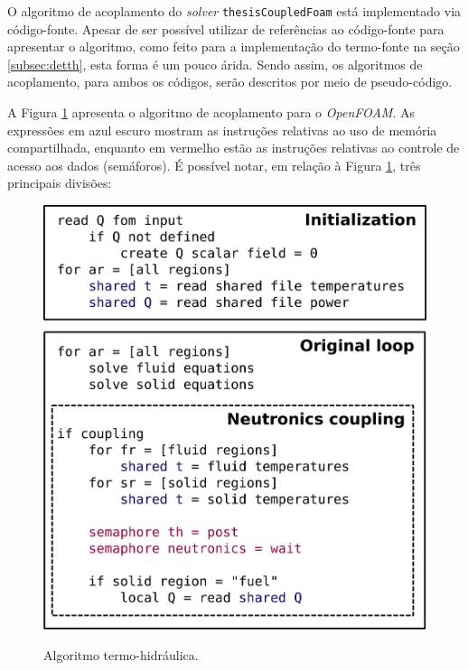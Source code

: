 O algoritmo de acoplamento do \textit{solver} \texttt{thesisCoupledFoam} está implementado
via código-fonte. Apesar de ser possível utilizar de referências ao código-fonte para
apresentar o algoritmo, como feito para a implementação do termo-fonte na seção \ref{subsec:detth},
esta forma é um pouco árida. Sendo assim, os algoritmos de acoplamento, para ambos os códigos,
serão descritos por meio de pseudo-código.

A Figura \ref{fig:algo_th} apresenta o algoritmo de acoplamento para o \textit{OpenFOAM}.
As expressões em azul escuro mostram as instruções relativas ao uso de memória compartilhada,
enquanto em vermelho estão as instruções relativas ao controle de acesso aos dados (semáforos).
É possível notar, em relação à Figura \ref{fig:algo_th}, três principais divisões:

\begin{figure}[htb]
  \caption{Algoritmo termo-hidráulica.}
  \centering\includegraphics[scale=0.5]{figuras/algoritmo_openfoam.png}
  \label{fig:algo_th}
\end{figure}

